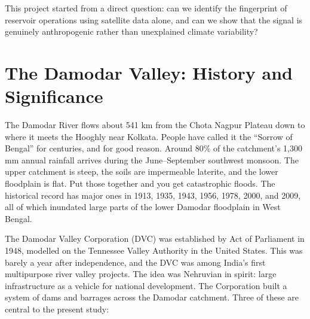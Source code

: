 \documentclass[12pt,a4paper,oneside]{report}
\begin{document}
This project started from a direct question: can we identify the fingerprint
of reservoir operations using satellite data alone, and can we show that the
signal is genuinely anthropogenic rather than unexplained climate variability?

\section{The Damodar Valley: History and Significance}

The Damodar River flows about 541 km from the Chota Nagpur Plateau down to
where it meets the Hooghly near Kolkata. People have called it the ``Sorrow
of Bengal'' for centuries, and for good reason. Around 80\% of the
catchment's 1,300 mm annual rainfall arrives during the June--September
southwest monsoon. The upper catchment is steep, the soils are impermeable
laterite, and the lower floodplain is flat. Put those together and you get
catastrophic floods. The historical record has major ones in 1913, 1935,
1943, 1956, 1978, 2000, and 2009, all of which inundated large parts of the
lower Damodar floodplain in West Bengal.

The Damodar Valley Corporation (DVC) was established by Act of Parliament in
1948, modelled on the Tennessee Valley Authority in the United States. This
was barely a year after independence, and the DVC was among India's first
multipurpose river valley projects. The idea was Nehruvian in spirit: large
infrastructure as a vehicle for national development. The Corporation built
a system of dams and barrages across the Damodar catchment. Three of these
are central to the present study:
\end{document}
